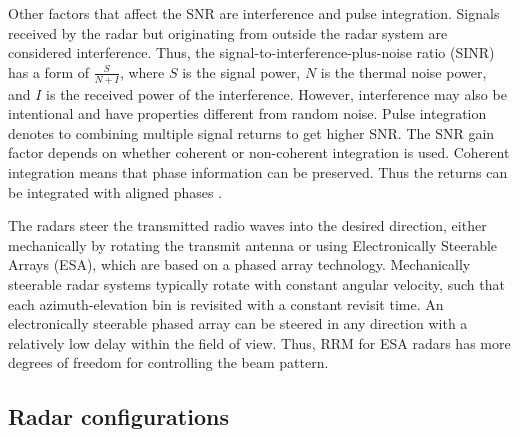 \documentclass[english, 12pt, a4paper, elec, utf8, a-1b, online]{aaltothesis}
\begin{document}
Other factors that affect the SNR are interference and pulse integration.
Signals received by the radar but originating from outside the radar system are considered interference.
Thus, the signal-to-interference-plus-noise ratio (SINR) has a form of $\frac{S}{N+I}$, where
$S$ is the signal power,
$N$ is the thermal noise power, and
$I$ is the received power of the interference.
However, interference may also be intentional and have properties different from random noise. 
Pulse integration denotes to combining multiple signal returns to get higher SNR.
The SNR gain factor depends on whether coherent or non-coherent integration is used.
Coherent integration means that phase information can be preserved. 
Thus the returns can be integrated with aligned phases \cite{Curry2011}.

The radars steer the transmitted radio waves into the desired direction, either mechanically by rotating the transmit antenna or using Electronically Steerable Arrays (ESA), which are based on a phased array technology.
Mechanically steerable radar systems typically rotate with constant angular velocity, such that each azimuth-elevation bin is revisited with a constant revisit time.
An electronically steerable phased array can be steered in any direction with a relatively low delay within the field of view.
Thus, RRM for ESA radars has more degrees of freedom for controlling the beam pattern.


\subsection{Radar configurations} \label{sec:radar_types}
\end{document}
